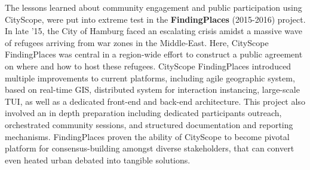 {The lessons learned about community engagement and public participation using CityScope, were put into extreme test in the \textbf{FindingPlaces} (2015-2016) project. In late '15, the City of Hamburg faced an escalating crisis amidst a massive wave of refugees arriving from war zones in the Middle-East. Here, CityScope FindingPlaces was central in a region-wide effort to construct a public agreement on where and how to host these refugees. CityScope FindingPlaces introduced multiple improvements to current platforms, including agile geographic system, based on real-time GIS, distributed system for interaction instancing, large-scale TUI, as well as a dedicated front-end and back-end architecture. This project also involved an in depth preparation including dedicated participants outreach, orchestrated community sessions, and structured documentation and reporting mechanisms. FindingPlaces proven the ability of CityScope to become pivotal platform for consensus-building amongst diverse stakeholders, that can convert even heated urban debated into tangible solutions.}